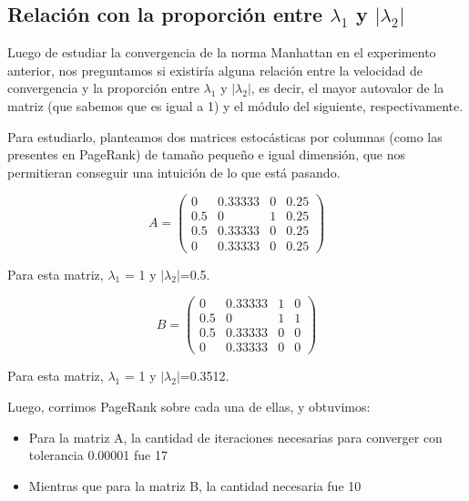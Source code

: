 \documentclass[a4paper]{article}
\begin{document}
\subsection*{Relación con la proporción entre $\lambda_1$ y $|\lambda_2|$}


Luego de estudiar la convergencia de la norma Manhattan en el experimento anterior, nos preguntamos si existiría alguna relación entre la velocidad de convergencia y la proporción entre $\lambda_1$ y $|\lambda_2|$, es decir, el mayor autovalor de la matriz (que sabemos que es igual a 1) y el módulo del siguiente, respectivamente.\newline

Para estudiarlo, planteamos dos matrices estocásticas por columnas (como las presentes en PageRank) de tamaño pequeño e igual dimensión, que nos permitieran conseguir una intuición de lo que está pasando.

\begin{equation}
A = \left(
\begin{array}{cccc}
0 & 0.33333 & 0 & 0.25 \\
0.5 & 0 & 1 & 0.25 \\
0.5 & 0.33333 & 0 & 0.25 \\
0 & 0.33333 & 0 & 0.25
\end{array}
\right)
\end{equation}

Para esta matriz, $\lambda_1$ = 1 y $|\lambda_2|$=0.5.

\begin{equation}
B = \left(
\begin{array}{cccc}
0 & 0.33333 & 1 & 0 \\
0.5 & 0 & 1 & 1 \\
0.5 & 0.33333 & 0 & 0 \\
0 & 0.33333 & 0 & 0
\end{array}
\right)
\end{equation}

Para esta matriz, $\lambda_1$ = 1 y $|\lambda_2|$=0.3512.

Luego, corrimos PageRank sobre cada una de ellas, y obtuvimos:
\begin{itemize}
\item Para la matriz A, la cantidad de iteraciones necesarias para converger con tolerancia 0.00001 fue 17
\item Mientras que para la matriz B, la cantidad necesaria fue 10
\end{itemize}
\end{document}

